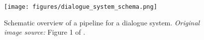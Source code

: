 \begin{figure}[H]
    \centering
    \texttt{[image: figures/dialogue\_system\_schema.png]}
    \caption{Schematic overview of a pipeline for a dialogue system. \textit{Original image source:} Figure 1 of \cite{chen-etal-2017-deep}.}
    \label{fig:dialogue_system_overview}
\end{figure}








